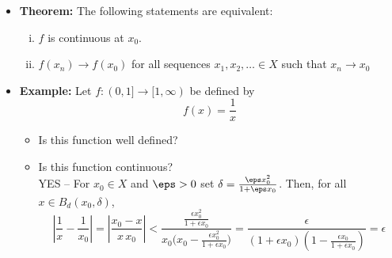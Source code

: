 \documentclass[11pt,twoside]{report}
\newcommand{\bbR}{{\mathbb{R}}}
\begin{document}
\begin{itemize}
\begin{itemize}
\begin{itemize}
\item   $f$ is \textbf{continuous} if it is continuous at points in $X$, i.e., 
\[
 \forall \eps > 0,   \, \forall x_0 \in X, \, \exists \delta > 0,  \,  \forall x \in X ,  \quad \big( d_X(x_0,x) < \delta \; \implies \;   d_Y\big( f(x_0) , f(x) \big)  < \eps \big)
\]


\item   $f$ is \textbf{uniformly continuous} if
\[
\forall \eps > 0,  \, \exists \delta > 0,  \, \forall x_0, x  \in X\,  ,  \quad \big( d_X(x_0,x) < \delta \; \implies \;   d_Y\big( f(x_0) , f(x) \big)  < \eps \big)
\]
In other words, $\delta$ can be chosen independently of $x_0$.

\item   $f$ is \textbf{Lipchitz continuous}  on $A \subseteq X$ if there exists a constant $L \in \bbR$ such that
\[
d_Y(f(x), f(x')) \le L d_X(x,x') \quad \text{for all $x,x' \in A$}
\]

\end{itemize}




\item \textbf{Theorem:} The following statements are equivalent: 
\begin{enumerate}[(i)]
\item  $f$ is continuous at $x_0$. 
\item  $f(x_n) \to f(x_0)$ for all sequences $x_1,x_2,\ldots  \in X$ such that $x_n \to x_0$
\end{enumerate}

\item \textbf{Example:} Let $f \colon (0,1] \to [1,\infty)$ be defined by
\[
f(x) = \frac{1}{x} 
\]
\begin{itemize}
\item Is this function well defined?

\item Is this function continuous?\\

YES -- For $x_0 \in X$ and $\eps  >0$ set $\delta = \frac{ \eps x_0^2}{ 1 + \eps x_0}$. Then, for all $x \in B_d(x_0, \delta)$,  
  \[ \left| \frac{1}{x}-\frac{1}{x_0} \right| = \left| \frac{x_0 - x}{x \, x_0} \right| < \frac{\frac{\epsilon x_0^2}{1+\epsilon x_0}}{x_0 \big( x_0 - \frac{\epsilon x_0^2}{1+\epsilon x_0} \big)} = \frac{\epsilon}{(1+\epsilon x_0)( 1 - \frac{\epsilon x_0}{1+\epsilon x_0})} = \epsilon\] 


\end{itemize}
\end{itemize}
\end{itemize}
\end{document}
